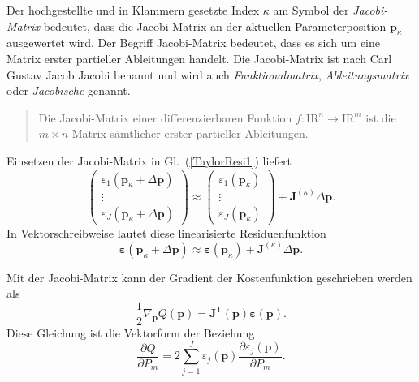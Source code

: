 Der hochgestellte und in Klammern gesetzte Index $\kappa$ am Symbol der \textsl{Jacobi-Matrix} bedeutet, dass die Jacobi-Matrix an der aktuellen Parameterposition $\mathbf{p}_\kappa$ ausgewertet wird.
Der Begriff Jacobi-Matrix bedeutet, dass es sich um eine Matrix erster
partieller Ableitungen handelt. Die Jacobi-Matrix ist nach Carl Gustav Jacob Jacobi benannt und wird auch \textsl{Funktionalmatrix}, \textsl{Ableitungsmatrix} oder \textsl{Jacobische} genannt.
\begin{quote}
Die Jacobi-Matrix einer differenzierbaren Funktion
$f\!: \mathrm{I\!R}^{n} \to \mathrm{I\!R}^{m}$ ist die
$m\times n$-Matrix sämtlicher erster partieller Ableitungen.
\end{quote}

Einsetzen der Jacobi-Matrix in Gl.~(\ref{TaylorResi1}) liefert
\begin{equation}
\left(\begin{array}{c}
\varepsilon_1(\mathbf{p}_\kappa+\Delta\mathbf{p}) \\
\vdots \\
\varepsilon_J(\mathbf{p}_\kappa+\Delta\mathbf{p})
\end{array}\right)
\approx
\left(\begin{array}{c}
\varepsilon_1(\mathbf{p}_\kappa) \\
\vdots \\
\varepsilon_J(\mathbf{p}_\kappa)
\end{array}\right)
+
\boldsymbol{J}^{(\kappa)}
\Delta \mathbf{p}.
\label{TaylorResi2}
\end{equation}
In Vektorschreibweise lautet diese linearisierte Residuenfunktion
\begin{equation}
\boldsymbol{\varepsilon}(\mathbf{p}_\kappa+\Delta\mathbf{p})
\approx
\boldsymbol{\varepsilon}(\mathbf{p}_\kappa)
+
\boldsymbol{J}^{(\kappa)}
\Delta \mathbf{p}.
\label{TaylorResi3}
\end{equation}

Mit der Jacobi-Matrix kann der Gradient der Kostenfunktion geschrieben werden als
\begin{equation}
\frac{1}{2}
\nabla_{\mathbf{p}} Q(\mathbf{p})
=
\boldsymbol{J}^\mathsf{T}(\mathbf{p})
\boldsymbol{\varepsilon}(\mathbf{p}).
\label{ZielfunktionalGradJ}
\end{equation}
Diese Gleichung ist die Vektorform der Beziehung
$$
\frac{\partial Q}{\partial P_m}
=
2
\sum_{j=1}^{J}
\varepsilon_j(\mathbf{p})
\frac{\partial \varepsilon_j(\mathbf{p})}{\partial P_m}.
$$

